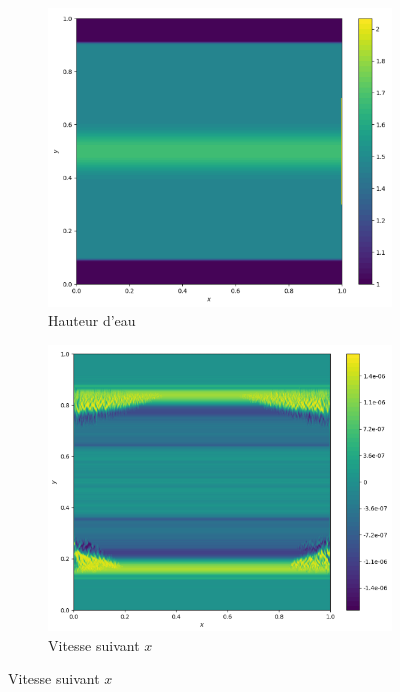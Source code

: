 \documentclass[
	french,
	11pt, %
]{fphw}
\begin{document}
\begin{figure}[H]
	\centering
	\begin{subfigure}{0.32\textwidth}
		\centering
		\includegraphics[width=\textwidth,height=0.85\textwidth]{Rusa2h.png}
		\caption{Hauteur d'eau}
		\label{fig:Rusa2h}
	\end{subfigure}
	\begin{subfigure}{0.32\textwidth}
		\centering
		\includegraphics[width=\textwidth,height=0.85\textwidth]{Rusa2u.png}
		\caption{Vitesse suivant $x$}

\end{subfigure}
\end{figure}
\end{document}
